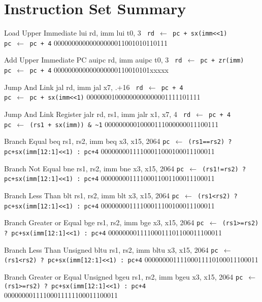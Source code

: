 \chapter{Instruction Set Summary}


\TDrawInsnTypeUPicture
{Load Upper Immediate}
{lui rd, imm}
{lui t0, 3}
{\tt%
rd $\leftarrow$ pc + sx(imm<<1)\\
pc $\leftarrow$ pc + 4}
{00000000000000000011001010110111}

\TDrawInsnTypeUPicture
{Add Upper Immediate PC}
{auipc rd, imm}
{auipc t0, 3}
{\tt%
rd $\leftarrow$ pc + zr(imm)\\
pc $\leftarrow$ pc + 4}
{000000000000000000110010101xxxxx}

\TDrawInsnTypeJPicture
{Jump And Link}
{jal rd, imm}
{jal x7, .+16}
{\tt%
rd $\leftarrow$ pc + 4\\
pc $\leftarrow$ pc + sx(imm<<1)}
{00000001000000000000001111101111}

\TDrawInsnTypeIPicture
{Jump And Link Register}
{jalr rd, rs1, imm}
{jalr x1, x7, 4}
{\tt%
rd $\leftarrow$ pc + 4\\
pc $\leftarrow$ (rs1 + sx(imm)) \& \textasciitilde{}1}
{00000000010000111000000011100111}

\TDrawInsnTypeBPicture
{Branch Equal}
{beq rs1, rs2, imm}
{beq x3, x15, 2064}
{\tt pc $\leftarrow$ (rs1==rs2) ? pc+sx(imm[12:1]<<1) : pc+4}
{00000000111100011000100011100011}

\TDrawInsnTypeBPicture
{Branch Not Equal}
{bne rs1, rs2, imm}
{bne x3, x15, 2064}
{\tt pc $\leftarrow$ (rs1!=rs2) ? pc+sx(imm[12:1]<<1) : pc+4}
{00000000111100011001100011100011}

\TDrawInsnTypeBPicture
{Branch Less Than}
{blt rs1, rs2, imm}
{blt x3, x15, 2064}
{\tt pc $\leftarrow$ (rs1<rs2) ? pc+sx(imm[12:1]<<1) : pc+4}
{00000000111100011100100011100011}

\TDrawInsnTypeBPicture
{Branch Greater or Equal}
{bge rs1, rs2, imm}
{bge x3, x15, 2064}
{\tt pc $\leftarrow$ (rs1>=rs2) ? pc+sx(imm[12:1]<<1) : pc+4}
{00000000111100011101100011100011}

\TDrawInsnTypeBPicture
{Branch Less Than Unsigned}
{bltu rs1, rs2, imm}
{bltu x3, x15, 2064}
{\tt pc $\leftarrow$ (rs1<rs2) ? pc+sx(imm[12:1]<<1) : pc+4}
{00000000111100011110100011100011}

\TDrawInsnTypeBPicture
{Branch Greater or Equal Unsigned}
{bgeu rs1, rs2, imm}
{bgeu x3, x15, 2064}
{\tt pc $\leftarrow$ (rs1>=rs2) ? pc+sx(imm[12:1]<<1) : pc+4}
{00000000111100011111100011100011}

